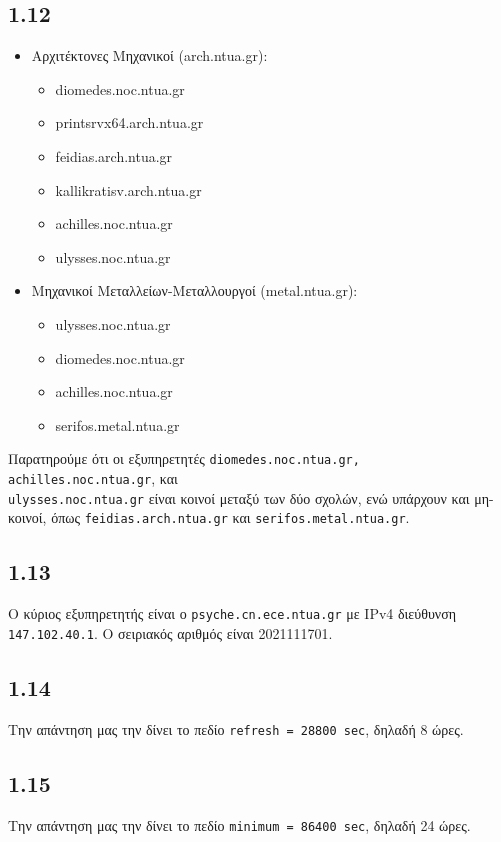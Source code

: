 		\subsection*{1.12} 
			\begin{itemize}
				\item Αρχιτέκτονες Μηχανικοί (arch.ntua.gr):
					\begin{itemize}
						\item diomedes.noc.ntua.gr
						\item printsrvx64.arch.ntua.gr
						\item feidias.arch.ntua.gr
						\item kallikratisv.arch.ntua.gr
						\item achilles.noc.ntua.gr
						\item ulysses.noc.ntua.gr
					\end{itemize} 
				\item Μηχανικοί Μεταλλείων-Μεταλλουργοί (metal.ntua.gr):
					\begin{itemize}
						\item ulysses.noc.ntua.gr
						\item diomedes.noc.ntua.gr
						\item achilles.noc.ntua.gr
						\item serifos.metal.ntua.gr
					\end{itemize}
			\end{itemize}
		
			Παρατηρούμε ότι οι εξυπηρετητές \verb|diomedes.noc.ntua.gr, achilles.noc.ntua.gr|, και \\ \verb|ulysses.noc.ntua.gr| είναι κοινοί μεταξύ των δύο σχολών, ενώ υπάρχουν και μη-κοινοί, όπως \verb|feidias.arch.ntua.gr| και \verb|serifos.metal.ntua.gr|.

		\subsection*{1.13} 
			Ο κύριος εξυπηρετητής είναι ο \verb|psyche.cn.ece.ntua.gr| με IPv4 διεύθυνση \verb|147.102.40.1|. Ο σειριακός αριθμός είναι 2021111701. 

		\subsection*{1.14} 
			Την απάντηση μας την δίνει το πεδίο \verb|refresh = 28800 sec|, δηλαδή 8 ώρες.

		\subsection*{1.15} 
			Την απάντηση μας την δίνει το πεδίο \verb|minimum = 86400 sec|, δηλαδή 24 ώρες.

